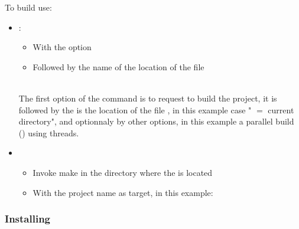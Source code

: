 To build use: 
\begin{itemize}
\item {}:
\begin{itemize}
\item With the  option
\item Followed by the name of the location of the file 
\end{itemize}
\vspace{-1cm}
\begin{scripti}
     
\end{scripti} 
\\[-0.75cm]
\noindent The first option of the command is to request to build the project, it is followed by the is the location of the file , in this example case " $=$ current directory", and optionnaly by other options, in this example a parallel build () using  threads. 
\item {}
\begin{itemize}
\item Invoke make in the directory where the  is located
\item With the project name as target, in this example: 
\end{itemize}
\vspace{-0.75cm}
\begin{scripti}
    
\end{scripti} 
\end{itemize}
\vspace{-1cm}
\subsubsection*{Installing}

